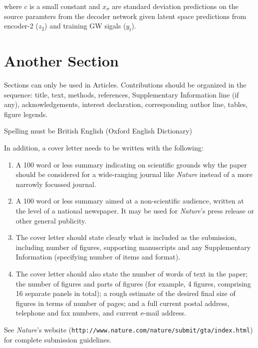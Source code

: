 \documentclass{nature}
\begin{document}
where $c$ is a small constant and $x_{\sigma}$ are standard deviation predictions 
on the source paramters from the decoder network given latent space predictions 
from encoder-2 ($z_2$) and training GW sigals ($y_{t}$).

%
%

%
%

%
%

\section*{Another Section}

Sections can only be used in Articles.  Contributions should be
organized in the sequence: title, text, methods, references,
Supplementary Information line (if any), acknowledgements,
interest declaration, corresponding author line, tables, figure
legends.

Spelling must be British English (Oxford English Dictionary)

In addition, a cover letter needs to be written with the
following:
\begin{enumerate}
 \item A 100 word or less summary indicating on scientific grounds
why the paper should be considered for a wide-ranging journal like
\textsl{Nature} instead of a more narrowly focussed journal.
 \item A 100 word or less summary aimed at a non-scientific audience,
written at the level of a national newspaper.  It may be used for
\textsl{Nature}'s press release or other general publicity.
 \item The cover letter should state clearly what is included as the
submission, including number of figures, supporting manuscripts
and any Supplementary Information (specifying number of items and
format).
 \item The cover letter should also state the number of
words of text in the paper; the number of figures and parts of
figures (for example, 4 figures, comprising 16 separate panels in
total); a rough estimate of the desired final size of figures in
terms of number of pages; and a full current postal address,
telephone and fax numbers, and current e-mail address.
\end{enumerate}

See \textsl{Nature}'s website
(\texttt{http://www.nature.com/nature/submit/gta/index.html}) for
complete submission guidelines.
\end{document}
